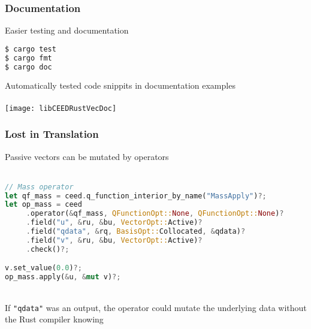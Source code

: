 \documentclass{beamer}
\begin{document}

\begin{frame}[fragile]
\begin{center}
\frametitle{Documentation}

Easier testing and documentation

{\footnotesize
\begin{lstlisting}[language=sh, style=boxedSH]
$ cargo test
$ cargo fmt
$ cargo doc
\end{lstlisting}
}

Automatically tested code snippits in documentation examples\\

~\\

\texttt{[image: libCEEDRustVecDoc]}

\end{center}
\end{frame}


\begin{frame}[fragile]
\begin{center}
\frametitle{Lost in Translation}

Passive vectors can be mutated by operators\\

~\\

{\footnotesize
\begin{lstlisting}[language=Rust, style=boxedRust]
// Mass operator
let qf_mass = ceed.q_function_interior_by_name("MassApply")?;
let op_mass = ceed
     .operator(&qf_mass, QFunctionOpt::None, QFunctionOpt::None)?
     .field("u", &ru, &bu, VectorOpt::Active)?
     .field("qdata", &rq, BasisOpt::Collocated, &qdata)?
     .field("v", &ru, &bu, VectorOpt::Active)?
     .check()?;

v.set_value(0.0)?;
op_mass.apply(&u, &mut v)?;
\end{lstlisting}
}

~\\

If {\color[rgb]{0, 0, 0.75} \lstinline[basicstyle=\ttfamily, columns=spaceflexible]{"qdata"}} was an output, the operator could mutate the underlying data without the Rust compiler knowing
\end{center}
\end{frame}
\end{document}

